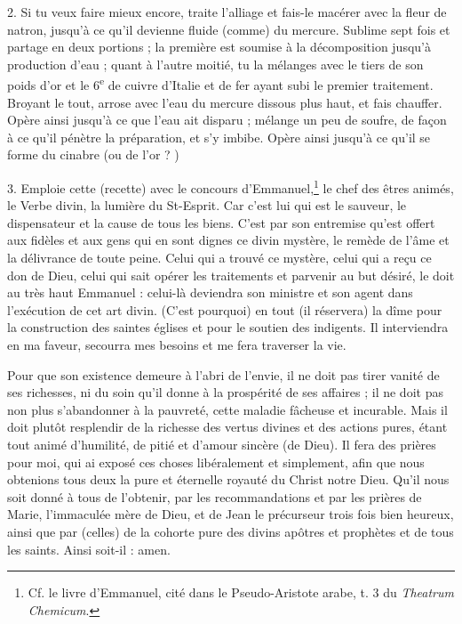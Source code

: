\documentclass[a4paper, 11pt, oneside, polutonikogreek, french]{article}
\begin{document}
2. Si tu veux faire mieux encore, traite l'alliage et fais-le macérer avec la fleur de natron, jusqu'à ce qu'il devienne fluide (comme) du mercure. Sublime sept fois et partage en deux portions ; la première est soumise à la décomposition jusqu'à production d'eau ; quant à l'autre moitié, tu la mélanges avec le tiers de son poids d'or et le 6\textsuperscript{e} de cuivre d'Italie et de fer ayant subi le premier traitement. Broyant le tout, arrose avec l'eau du mercure dissous plus haut, et fais chauffer. Opère ainsi jusqu'à ce que l'eau ait disparu ; mélange un peu de soufre, de façon à ce qu'il pénètre la préparation, et s'y imbibe. Opère ainsi jusqu'à ce qu'il se forme du cinabre (ou de l'or ? )

3. Emploie cette (recette) avec le concours d'Emmanuel,\footnote{Cf. le livre d'Emmanuel, cité dans le Pseudo-Aristote arabe, t. 3 du \emph{Theatrum Chemicum}.} le chef des êtres animés, le Verbe divin, la lumière du St-Esprit. Car c'est lui qui est le sauveur, le dispensateur et la cause de tous les biens. C'est par son entremise qu'est offert aux fidèles et aux gens qui en sont dignes ce divin mystère, le remède de l'âme et la délivrance de toute peine. Celui qui a trouvé ce mystère, celui qui a reçu ce don de Dieu, celui qui sait opérer les traitements et parvenir au but désiré, le doit au très haut Emmanuel : celui-là deviendra son ministre et son agent dans l'exécution de cet art divin. (C'est pourquoi) en tout (il réservera) la dîme pour la construction des saintes églises et pour le soutien des indigents. Il interviendra en ma faveur, secourra mes besoins et me fera traverser la vie.

Pour que son existence demeure à l'abri de l'envie, il ne doit pas tirer vanité de ses richesses, ni du soin qu'il donne à la prospérité de ses affaires ; il ne doit pas non plus s'abandonner à la pauvreté, cette maladie fâcheuse et incurable. Mais il doit plutôt resplendir de la richesse des vertus divines et des actions pures, étant tout animé d'humilité, de pitié et d'amour sincère (de Dieu). Il fera des prières pour moi, qui ai exposé ces choses libéralement et simplement, afin que nous obtenions tous deux la pure et éternelle royauté du Christ notre Dieu. Qu'il nous soit donné à tous de l'obtenir, par les recommandations et par les prières de Marie, l'immaculée mère de Dieu, et de Jean le précurseur trois fois bien heureux, ainsi que par (celles) de la cohorte pure des divins apôtres et prophètes et de tous les saints. Ainsi soit-il : amen.

\bigskip
\centerline{\EightStarTaper}
\centerline{\EightStarTaper\EightStarTaper}
\bigskip
\end{document}
